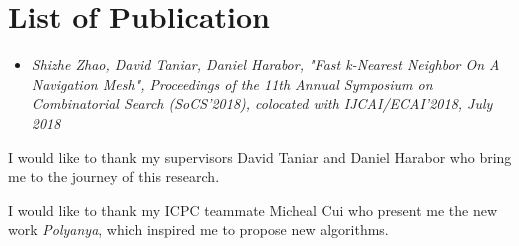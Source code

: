 \documentclass[a4paper,pdflatex,11pt,mitminorthesis,singlespace,oneside]{cssethesis}
\theoremstyle{remark}
\theoremstyle{definition}
\begin{document}
\frontmatter					%
\thesistitlepage				%
\thesiscopyrightpage			%
\tableofcontents				%
\pagebreak

\begin{thesisabstract}			%

\end{thesisabstract}                 

\chapter*{List of Publication}{
\begin{itemize}
\item \textit{Shizhe Zhao, David Taniar, Daniel Harabor, "Fast k-Nearest Neighbor On A Navigation
Mesh", Proceedings of the 11th Annual Symposium on Combinatorial Search (SoCS’2018), colocated with
IJCAI/ECAI’2018, July 2018}
\end{itemize}
}


\begin{thesisacknowledgments}	%
I would like to thank my supervisors David Taniar and
  Daniel Harabor who bring me to the journey of this research.

\noindent
  I would like to thank my ICPC teammate Micheal Cui who present me the new work
  \textit{Polyanya}, which inspired me to propose new algorithms.

\end{thesisacknowledgments}  

\mainmatter						%







\pagebreak



\end{document}
